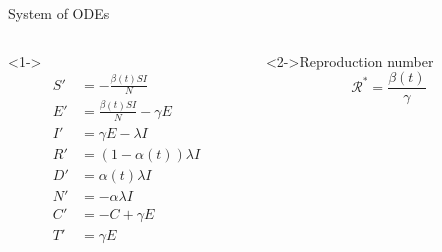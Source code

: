 \begin{frame}{System of ODEs}
    \begin{columns}
        \begin{column}{0.5\linewidth}
            \begin{definition}<1->
                \begin{equation*}
                    \begin{aligned}
                        S' &= - \frac{\beta(t) SI}{N} \\
                        E' &= \frac{\beta(t) SI}{N} - \gamma E \\
                        I' &= \gamma E - \lambda I \\
                        R' &= (1 - \alpha(t)) \lambda I \\
                        D' &= \alpha(t) \lambda I \\
                        N' &= - \alpha \lambda I \\
                        C' &= -C + \gamma E \\
                        T' &= \gamma E \\
                    \end{aligned}
                \end{equation*}
            \end{definition}
        \end{column}
        \begin{column}{0.5\linewidth}
            \begin{block}<2->{Reproduction number}
                \begin{equation*}
                    \mathcal{R}^* = \frac{\beta(t)}{\gamma}
                \end{equation*}
            \end{block}
        \end{column}
    \end{columns}
\end{frame}

